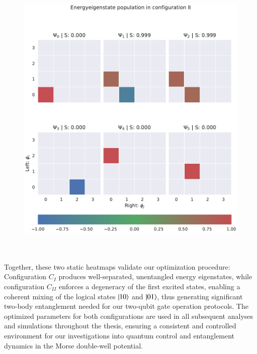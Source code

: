 \documentclass{subfiles}
\begin{document}
\begin{figure}[h!]
    \centering
    \includegraphics[width=1.0\textwidth]{figs/state_populations_II.pdf}
    \label{fig:state_populations_II}
\end{figure}
\\ \\

Together, these two static heatmaps validate our optimization procedure: Configuration $C_I$ produces well-separated, unentangled energy eigenstates, while configuration $C_{II}$ enforces a degeneracy of the first excited states, enabling a coherent mixing of the logical states $\ket{10}$ and $\ket{01}$, thus generating significant two-body entanglement needed for our two-qubit gate operation protocols. The optimized parameters for both configurations are used in all subsequent analyses and simulations throughout the thesis, ensuring a consistent and controlled environment for our investigations into quantum control and entanglement dynamics in the Morse double-well potential.
\end{document}
